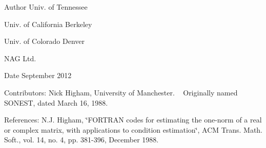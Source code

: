 \begin{DoxyAuthor}{Author}
Univ. of Tennessee 

Univ. of California Berkeley 

Univ. of Colorado Denver 

N\+A\+G Ltd. 
\end{DoxyAuthor}
\begin{DoxyDate}{Date}
September 2012 
\end{DoxyDate}
\begin{DoxyParagraph}{Contributors\+: }
Nick Higham, University of Manchester. ~\newline
 Originally named S\+O\+N\+E\+S\+T, dated March 16, 1988. 
\end{DoxyParagraph}
\begin{DoxyParagraph}{References\+: }
N.\+J. Higham, \char`\"{}\+F\+O\+R\+T\+R\+A\+N codes for estimating the one-\/norm of
  a real or complex matrix, with applications to condition estimation\char`\"{}, A\+C\+M Trans. Math. Soft., vol. 14, no. 4, pp. 381-\/396, December 1988. 
\end{DoxyParagraph}
